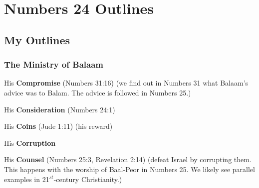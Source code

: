 \section{Numbers 24 Outlines}

\subsection{My Outlines}

\subsubsection{The Ministry of Balaam}
\begin{compactenum}[I.][8]
    \item His \textbf{Compromise}  (Numbers 31:16) (we find out in Numbers 31 what Balaam's advice was to Balam. The advice is followed in Numbers 25.)
    \item His \textbf{Consideration}  (Numbers 24:1) 
    \item His \textbf{Coins}  (Jude 1:11) (his reward)
    \item His \textbf{Corruption} %
    \item His \textbf{Counsel}   (Numbers 25:3, Revelation 2:14) (defeat Israel by corrupting them. This happens with the worship of Baal-Peor in Numbers 25. We likely see parallel examples in 21$^{st}$-century Christianity.)
\end{compactenum}

